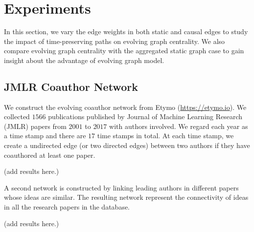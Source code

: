 \documentclass[12pt]{article}
\theoremstyle{definition}
\begin{document}
\section{Experiments}
\label{sec:experiments}

In this section, we vary the edge
weights in both static and causal edges to study the impact of time-preserving paths on evolving graph centrality.
We also compare evolving graph centrality with the aggregated static graph case to gain insight about the advantage of evolving graph model.

\subsection{JMLR Coauthor Network}
\label{sec:jmlr-coauth-netw}


We construct the evolving coauthor network from Etymo (\url{https://etymo.io}).
We collected $1566$ publications published by Journal of Machine Learning Research (JMLR) papers from $2001$ to $2017$ with authors involved. We regard each year
as a time stamp and there are $17$ time stamps in total. At each time stamp, we
create a undirected edge (or two directed edges) between two authors if they have coauthored at least one paper.

(add results here.)

A second network is constructed by linking leading authors in different papers whose
ideas are similar. The resulting network represent the connectivity of ideas in all the research papers in the database.

(add results here.)











\end{document}
